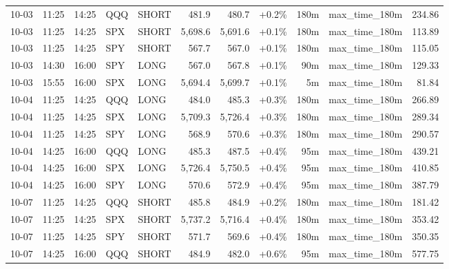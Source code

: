\documentclass[11pt,a4paper,twoside]{article}
\begin{document}
\begin{center}
\begin{longtable}{>{\color{txtmain}}l l l l l r r r r >{\color{txtmain}}l r}
10-03 & 11:25 & 14:25 & QQQ & SHORT & 481.9 & 480.7 & \textcolor{wingreen}{+0.2\%} & 180m & max\_time\_180m & \textcolor{wingreen}{234.86} \\
10-03 & 11:25 & 14:25 & SPX & SHORT & 5,698.6 & 5,691.6 & \textcolor{wingreen}{+0.1\%} & 180m & max\_time\_180m & \textcolor{wingreen}{113.89} \\
10-03 & 11:25 & 14:25 & SPY & SHORT & 567.7 & 567.0 & \textcolor{wingreen}{+0.1\%} & 180m & max\_time\_180m & \textcolor{wingreen}{115.05} \\
10-03 & 14:30 & 16:00 & SPY & LONG & 567.0 & 567.8 & \textcolor{wingreen}{+0.1\%} & 90m & max\_time\_180m & \textcolor{wingreen}{129.33} \\
10-03 & 15:55 & 16:00 & SPX & LONG & 5,694.4 & 5,699.7 & \textcolor{wingreen}{+0.1\%} & 5m & max\_time\_180m & \textcolor{wingreen}{81.84} \\
10-04 & 11:25 & 14:25 & QQQ & LONG & 484.0 & 485.3 & \textcolor{wingreen}{+0.3\%} & 180m & max\_time\_180m & \textcolor{wingreen}{266.89} \\
10-04 & 11:25 & 14:25 & SPX & LONG & 5,709.3 & 5,726.4 & \textcolor{wingreen}{+0.3\%} & 180m & max\_time\_180m & \textcolor{wingreen}{289.34} \\
10-04 & 11:25 & 14:25 & SPY & LONG & 568.9 & 570.6 & \textcolor{wingreen}{+0.3\%} & 180m & max\_time\_180m & \textcolor{wingreen}{290.57} \\
10-04 & 14:25 & 16:00 & QQQ & LONG & 485.3 & 487.5 & \textcolor{wingreen}{+0.4\%} & 95m & max\_time\_180m & \textcolor{wingreen}{439.21} \\
10-04 & 14:25 & 16:00 & SPX & LONG & 5,726.4 & 5,750.5 & \textcolor{wingreen}{+0.4\%} & 95m & max\_time\_180m & \textcolor{wingreen}{410.85} \\
10-04 & 14:25 & 16:00 & SPY & LONG & 570.6 & 572.9 & \textcolor{wingreen}{+0.4\%} & 95m & max\_time\_180m & \textcolor{wingreen}{387.79} \\
10-07 & 11:25 & 14:25 & QQQ & SHORT & 485.8 & 484.9 & \textcolor{wingreen}{+0.2\%} & 180m & max\_time\_180m & \textcolor{wingreen}{181.42} \\
10-07 & 11:25 & 14:25 & SPX & SHORT & 5,737.2 & 5,716.4 & \textcolor{wingreen}{+0.4\%} & 180m & max\_time\_180m & \textcolor{wingreen}{353.42} \\
10-07 & 11:25 & 14:25 & SPY & SHORT & 571.7 & 569.6 & \textcolor{wingreen}{+0.4\%} & 180m & max\_time\_180m & \textcolor{wingreen}{350.35} \\
10-07 & 14:25 & 16:00 & QQQ & SHORT & 484.9 & 482.0 & \textcolor{wingreen}{+0.6\%} & 95m & max\_time\_180m & \textcolor{wingreen}{577.75} \\

\end{longtable}
\end{center}
\end{document}
